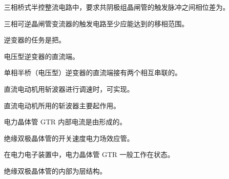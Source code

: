 \documentclass[电力电子]{subfiles}
\begin{document}
\begin{ti}
	三相桥式半控整流电路中，要求共阴极组晶闸管的触发脉冲之间相位差为。
\end{ti}

\begin{ti}
	三相可逆晶闸管变流器的触发电路至少应能达到的移相范围。
\end{ti}

\begin{ti}
	逆变器的任务是把。
\end{ti}

\begin{ti}
	电压型逆变器的直流端。
\end{ti}

\begin{ti}
	单相半桥（电压型）逆变器的直流端接有两个相互串联的。
\end{ti}

\begin{ti}
	直流电动机用斩波器进行调速时，可实现。
\end{ti}

\begin{ti}
	直流电动机所用的斩波器主要起作用。
\end{ti}

\begin{ti}
	电力晶体管 GTR 内部电流是由形成的。
\end{ti}

\begin{ti}
	绝缘双极晶体管的开关速度电力场效应管。
\end{ti}

\begin{ti}
	在电力电子装置中，电力晶体管 GTR 一般工作在状态。
\end{ti}

\begin{ti}
	绝缘双极晶体管的内部为层结构。
\end{ti}
\end{document}
